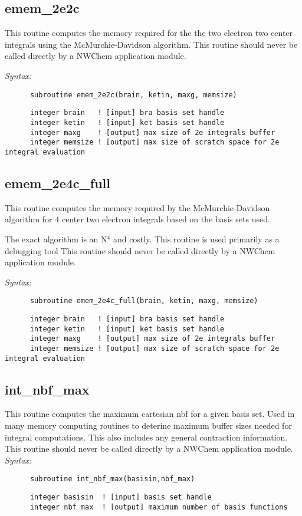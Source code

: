\subsection{emem\_2e2c} 
This routine computes the memory required for the the two electron 
two center integrals using the McMurchie-Davidson algorithm.  
This routine should never be called directly by a  
NWChem application module. 
 
{\it Syntax:} 
\begin{verbatim} 
      subroutine emem_2e2c(brain, ketin, maxg, memsize) 
\end{verbatim} 
\begin{verbatim} 
      integer brain   ! [input] bra basis set handle 
      integer ketin   ! [input] ket basis set handle 
      integer maxg    ! [output] max size of 2e integrals buffer 
      integer memsize ! [output] max size of scratch space for 2e integral evaluation 
\end{verbatim} 
\subsection{emem\_2e4c\_full} 
This routine computes the memory required by the McMurchie-Davidson  
algorithm for 4 center two electron integrals based on the  
basis sets used.   
 
The exact algorithm is an N$^4$ and costly.  This routine is used 
primarily as a debugging tool 
This routine should never be called directly by a  
NWChem application module. 
 
{\it Syntax:} 
\begin{verbatim} 
      subroutine emem_2e4c_full(brain, ketin, maxg, memsize) 
\end{verbatim} 
\begin{verbatim} 
      integer brain   ! [input] bra basis set handle 
      integer ketin   ! [input] ket basis set handle 
      integer maxg    ! [output] max size of 2e integrals buffer 
      integer memsize ! [output] max size of scratch space for 2e integral evaluation 
\end{verbatim} 
\subsection{int\_nbf\_max} 
This routine computes the maximum cartesian nbf for a given basis 
set.  Used in many memory computing routines to deterine maximum 
buffer sizes needed for integral computations.  This also includes 
any general contraction information. 
This routine should never be called directly by a  
NWChem application module. 
{\it Syntax:} 
\begin{verbatim} 
      subroutine int_nbf_max(basisin,nbf_max) 
\end{verbatim} 
\begin{verbatim} 
      integer basisin  ! [input] basis set handle 
      integer nbf_max  ! [output] maximum number of basis functions 
\end{verbatim} 
